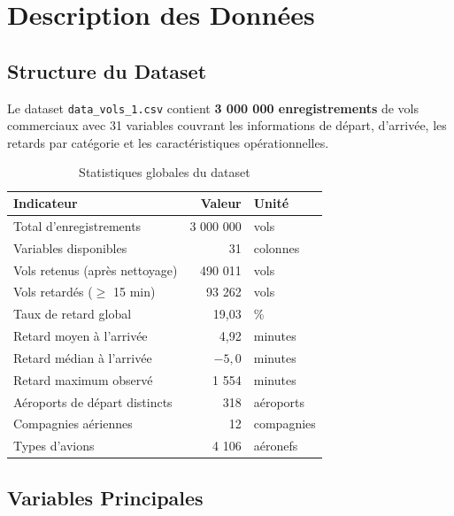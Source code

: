 \documentclass[12pt,a4paper]{article}
\begin{document}
\newpage
\section{Description des Données}

\subsection{Structure du Dataset}

Le dataset \texttt{data\_vols\_1.csv} contient \textbf{3 000 000 enregistrements} 
de vols commerciaux avec 31 variables couvrant les informations de départ, d'arrivée, 
les retards par catégorie et les caractéristiques opérationnelles.

\begin{table}[H]
  \centering
  \caption{Statistiques globales du dataset}
  \begin{tabular}{lrl}
    \toprule
    \textbf{Indicateur} & \textbf{Valeur} & \textbf{Unité} \\
    \midrule
    Total d'enregistrements & 3 000 000 & vols \\
    Variables disponibles & 31 & colonnes \\
    Vols retenus (après nettoyage) & 490 011 & vols \\
    Vols retardés ($\geq$ 15 min) & 93 262 & vols \\
    Taux de retard global & 19,03 & \% \\
    Retard moyen à l'arrivée & 4,92 & minutes \\
    Retard médian à l'arrivée & $-5,0$ & minutes \\
    Retard maximum observé & 1 554 & minutes \\
    Aéroports de départ distincts & 318 & aéroports \\
    Compagnies aériennes & 12 & compagnies \\
    Types d'avions & 4 106 & aéronefs \\
    \bottomrule
  \end{tabular}
\end{table}

\subsection{Variables Principales}
\end{document}
